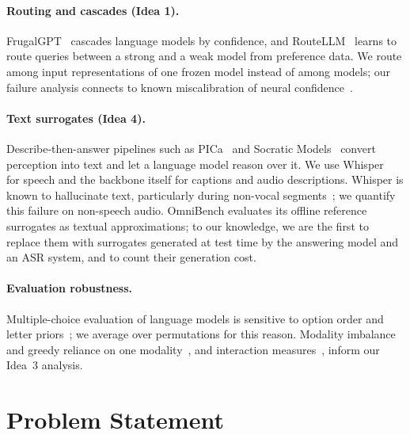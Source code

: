 \documentclass{article}
\begin{document}
\paragraph{Routing and cascades (Idea 1).} FrugalGPT~\citep{chen2023frugalgpt}
cascades language models by confidence, and RouteLLM~\citep{ong2024routellm} learns
to route queries between a strong and a weak model from preference data. We route
among input representations of one frozen model instead of among models; our
failure analysis connects to known miscalibration of neural
confidence~\citep{guo2017calibration}.

\paragraph{Text surrogates (Idea 4).} Describe-then-answer pipelines such as
PICa~\citep{yang2022pica} and Socratic Models~\citep{zeng2023socratic} convert
perception into text and let a language model reason over it. We use
Whisper~\citep{radford2023whisper} for speech and the backbone itself for captions
and audio descriptions. Whisper is known to hallucinate text, particularly during
non-vocal segments~\citep{koenecke2024careless}; we quantify this failure on
non-speech audio. OmniBench evaluates its offline reference surrogates as textual
approximations; to our knowledge, we are the first to replace them with surrogates
generated at test time by the answering model and an ASR system, and to count their
generation cost.

\paragraph{Evaluation robustness.} Multiple-choice evaluation of language models
is sensitive to option order and letter
priors~\citep{zheng2024mcq,pezeshkpour2024order}; we average over permutations for
this reason. Modality imbalance and greedy reliance on one
modality~\citep{wu2022greedy,peng2022ogm}, and interaction
measures~\citep{hessel2020emap,liang2023pid}, inform our Idea~3 analysis.

\section{Problem Statement}
\label{sec:problem}
\end{document}
